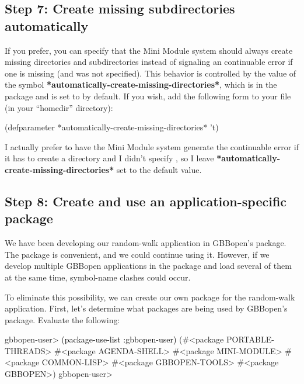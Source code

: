 \documentclass[10pt,twoside,english,pdftex]{article}
\begin{document}
\subsection*{Step 7: Create missing subdirectories automatically}

%
If you prefer, you can specify that the Mini Module system should always
create missing  directories and subdirectories
instead of signaling an continuable error if one is missing (and
 was not specified).  This behavior is controlled by the
value of the symbol \textbf{*automatically-create-missing-directories*}, which
is in the  package and is set to \nil{} by default.
If you wish, add the following form to your  file (in
your ``homedir'' directory):
%
\W\supp
\begin{example}
  (defparameter *automatically-create-missing-directories* 't)
\end{example}

I actually prefer to have the Mini Module system generate the continuable
error if it has to create a  directory and I
didn't specify , so I leave
\textbf{*automatically-create-missing-directories*} set to the default \nil{}
value.

\subsection*{Step 8: Create and use an application-specific package}

We have been developing our random-walk application in GBBopen's
 package.  The  package is convenient,
and we could continue using it.  However, if we develop multiple GBBopen
applications in the  package and load several of them at
the same time, symbol-name clashes could occur.

To eliminate this possibility, we can create our own package for the
random-walk application.  First, let's determine what packages are being used
by GBBopen's  package.  Evaluate the following:
%
\W\supp
\begin{example}
\textcolor{darkergray}{%
  gbbopen-user> \textcolor{black}{(package-use-list :gbbopen-user)}
  (#<package PORTABLE-THREADS> #<package AGENDA-SHELL>
   #<package MINI-MODULE> #<package COMMON-LISP>
   #<package GBBOPEN-TOOLS> #<package GBBOPEN>)
  gbbopen-user>}
\end{example}
\end{document}
